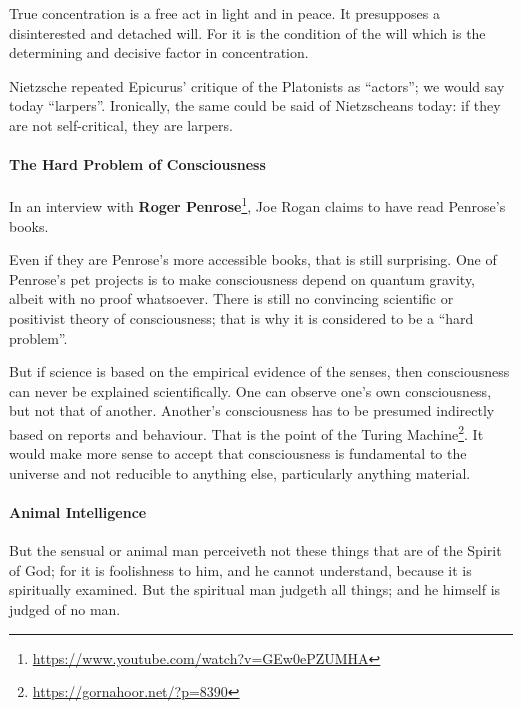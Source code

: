 \begin{quotex}
True concentration is a free act in light and in peace. It presupposes a disinterested and detached will. For it is the condition of the will which is the determining and decisive factor in concentration.
\end{quotex}


Nietzsche repeated Epicurus' critique of the Platonists as ``actors''; we would say today ``larpers''. Ironically, the same could be said of Nietzscheans today: if they are not self-critical, they are larpers.

\paragraph{The Hard Problem of Consciousness}


In an interview with \textbf{Roger Penrose}\footnote{\url{https://www.youtube.com/watch?v=GEw0ePZUMHA}}, Joe Rogan claims to have read Penrose's books.

Even if they are Penrose's more accessible books, that is still surprising. One of Penrose's pet projects is to make consciousness depend on quantum gravity, albeit with no proof whatsoever. There is still no convincing scientific or positivist theory of consciousness; that is why it is considered to be a ``hard problem''.

But if science is based on the empirical evidence of the senses, then consciousness can never be explained scientifically. One can observe one's own consciousness, but not that of another. Another's consciousness has to be presumed indirectly based on reports and behaviour. That is the point of the Turing Machine\footnote{\url{https://gornahoor.net/?p=8390}}. It would make more sense to accept that consciousness is fundamental to the universe and not reducible to anything else, particularly anything material.

\paragraph{Animal Intelligence}


\begin{quotex}
But the sensual or animal man perceiveth not these things that are of the Spirit of God; for it is foolishness to him, and he cannot understand, because it is spiritually examined. But the spiritual man judgeth all things; and he himself is judged of no man.
\end{quotex}


